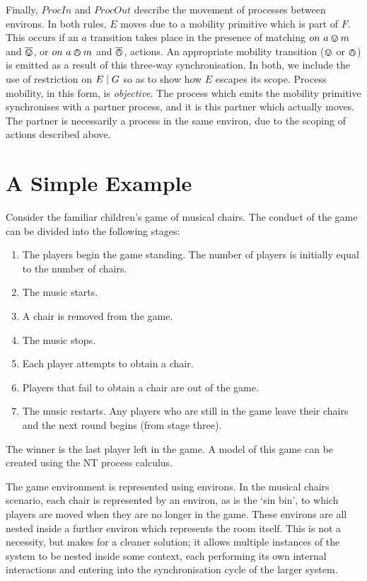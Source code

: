 Finally, $ProcIn$ and $ProcOut$ describe the movement of processes
between environs.  In both rules, $E$ moves due to a mobility
primitive which is part of $F$.  This occurs if an $a$ transition
takes place in the presence of matching $on\ a \varovee m$ and $\overline{\varovee}$, or
$on\ a \varowedge m$ and $\overline{\varowedge}$, actions.  An appropriate mobility
transition ($\varovee$ or $\varowedge$) is emitted as a result of this
three-way synchronisation.  In both, we include the use of restriction
on $E \;|\; G$ so as to show how $E$ escapes its scope.  Process
mobility, in this form, is \emph{objective}.  The process which emits
the mobility primitive synchronises with a partner process, and it is
this partner which actually moves.  The partner is necessarily a
process in the same environ, due to the scoping of actions described
above.

\section{A Simple Example}
\label{example}

Consider the familiar children's game of musical chairs.  The conduct of
the game can be divided into the following stages:
\begin{enumerate}
\item The players begin the game standing.  The number of players is
initially equal to the number of chairs.
\item The music starts.
\item A chair is removed from the game.
\item The music stops.
\item Each player attempts to obtain a chair.
\item Players that fail to obtain a chair are out of the game.
\item The music restarts.  Any players who are still in the game leave
  their chairs and the next round begins (from stage three).
\end{enumerate}
The winner is the last player left in the game.  A model of
this game can be created using the NT process calculus.

The game environment is represented using environs.  In the musical
chairs scenario, each chair is represented by an environ, as is the `sin
bin', to which players are moved when they are no longer in the game.
These environs are all nested inside a further environ which represents
the room itself.  This is not a necessity, but makes for a cleaner
solution; it allows multiple instances of the system to be nested inside
some context, each performing its own internal interactions and entering
into the synchronisation cycle of the larger system.

